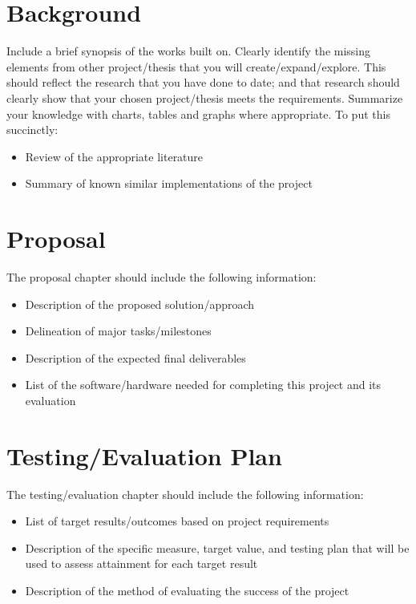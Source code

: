 \documentclass[ms,twoside,print]{nuthesis}
\begin{document}
\chapter{Background}

Include a brief synopsis of the works built on. Clearly identify the missing elements from other project/thesis that you will create/expand/explore. This should reflect the research that you have done to date; and that research should clearly show that your chosen project/thesis meets the requirements. Summarize your knowledge with charts, tables and graphs where appropriate. To put this succinctly: 
\begin{itemize}
  \item Review of the appropriate literature
  \item Summary of known similar implementations of the project
\end{itemize}

\chapter{Proposal}

The proposal chapter should include the following information:
\begin{itemize}
  \item Description of the proposed solution/approach
  \item Delineation of major tasks/milestones
  \item Description of the expected final deliverables
  \item List of the software/hardware needed for completing this project and its evaluation 
\end{itemize}

\chapter{Testing/Evaluation Plan}
The testing/evaluation chapter should include the following information:
\begin{itemize}
  \item List of target results/outcomes based on project requirements
  \item Description of the specific measure, target value, and testing plan that will be used to assess attainment for each target result
  \item Description of the method of evaluating the success of the project
\end{itemize}
\end{document}
